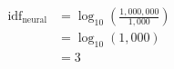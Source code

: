 \documentclass[preview]{standalone}
\begin{document}
\begin{align*}
\text{idf}_{\text{neural}} &= \log_{10} \left( \frac{1,000,000}{1,000} \right)\\ &= \log_{10}(1,000)\\ &= 3
\end{align*}
\end{document}
